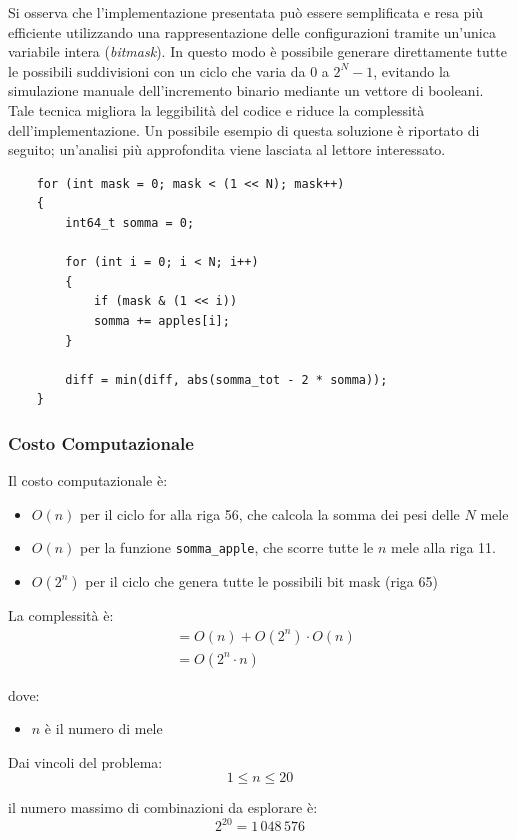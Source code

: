 Si osserva che l’implementazione presentata può essere semplificata e resa più efficiente utilizzando una rappresentazione delle configurazioni tramite un’unica variabile intera (\textit{bitmask}). In questo modo è possibile generare direttamente tutte le possibili suddivisioni con un ciclo che varia da $0$ a $2^N - 1$, evitando la simulazione manuale dell’incremento binario mediante un vettore di booleani. Tale tecnica migliora la leggibilità del codice e riduce la complessità dell’implementazione. Un possibile esempio di questa soluzione è riportato di seguito; un’analisi più approfondita viene lasciata al lettore interessato.

\begin{lstlisting}
	for (int mask = 0; mask < (1 << N); mask++)
	{
		int64_t somma = 0;
		
		for (int i = 0; i < N; i++)
		{
			if (mask & (1 << i))
			somma += apples[i];
		}
		
		diff = min(diff, abs(somma_tot - 2 * somma));
	}
\end{lstlisting}






\subsubsection*{Costo Computazionale}
Il costo computazionale è:
\begin{itemize}
	\item $O(n)$ per il ciclo for alla riga 56, che calcola la somma dei pesi delle $N$ mele
	\item $O(n)$ per la funzione \texttt{somma\_apple}, che scorre tutte le $n$ mele alla riga 11.
	\item $O(2^n)$ per il ciclo che genera tutte le possibili bit mask (riga 65)
\end{itemize}

La complessità è:
\begin{align*}
	&= O(n) + O(2^n) \cdot O(n) \\
	&= O(2^n \cdot n)
\end{align*}

dove:
\begin{itemize}
	\item $n$ è il numero di mele
\end{itemize}

\bigskip
Dai vincoli del problema:
\[
1 \le n \le 20
\]

il numero massimo di combinazioni da esplorare è:
\[
2^{20} = 1\,048\,576
\]

